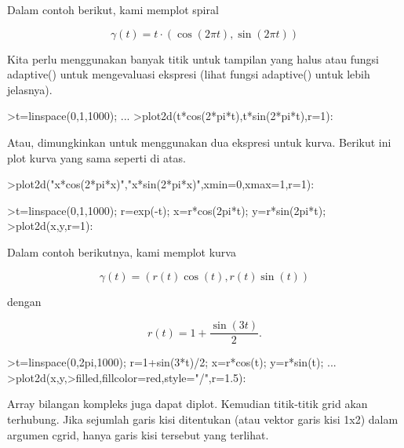 \documentclass{article}
\begin{document}
\begin{eulernotebook}
\begin{eulercomment}
\begin{eulercomment}
\begin{eulercomment}
\begin{eulercomment}
\begin{eulercomment}
Dalam contoh berikut, kami memplot spiral

\end{eulercomment}
\begin{eulerformula}
\[
\gamma(t) = t \cdot (\cos(2\pi t),\sin(2\pi t))
\]
\end{eulerformula}
\begin{eulercomment}
Kita perlu menggunakan banyak titik untuk tampilan yang halus atau
fungsi adaptive() untuk mengevaluasi ekspresi (lihat fungsi adaptive()
untuk lebih jelasnya).
\end{eulercomment}
\begin{eulerprompt}
>t=linspace(0,1,1000); ...
>plot2d(t*cos(2*pi*t),t*sin(2*pi*t),r=1):
\end{eulerprompt}
\begin{eulercomment}
Atau, dimungkinkan untuk menggunakan dua ekspresi untuk kurva. Berikut
ini plot kurva yang sama seperti di atas.
\end{eulercomment}
\begin{eulerprompt}
>plot2d("x*cos(2*pi*x)","x*sin(2*pi*x)",xmin=0,xmax=1,r=1):
\end{eulerprompt}
\begin{eulerprompt}
>t=linspace(0,1,1000); r=exp(-t); x=r*cos(2pi*t); y=r*sin(2pi*t);
>plot2d(x,y,r=1):
\end{eulerprompt}
\begin{eulercomment}
Dalam contoh berikutnya, kami memplot kurva

\end{eulercomment}
\begin{eulerformula}
\[
\gamma(t) = (r(t) \cos(t), r(t) \sin(t))
\]
\end{eulerformula}
\begin{eulercomment}
dengan

\end{eulercomment}
\begin{eulerformula}
\[
r(t) = 1 + \dfrac{\sin(3t)}{2}.
\]
\end{eulerformula}
\begin{eulerprompt}
>t=linspace(0,2pi,1000); r=1+sin(3*t)/2; x=r*cos(t); y=r*sin(t); ...
>plot2d(x,y,>filled,fillcolor=red,style="/",r=1.5):
\end{eulerprompt}
\begin{eulercomment}
Array bilangan kompleks juga dapat diplot. Kemudian titik-titik grid
akan terhubung. Jika sejumlah garis kisi ditentukan (atau vektor garis
kisi 1x2) dalam argumen cgrid, hanya garis kisi tersebut yang
terlihat.


\end{eulercomment}
\end{eulercomment}
\end{eulercomment}
\end{eulercomment}
\end{eulercomment}
\end{eulernotebook}
\end{document}
